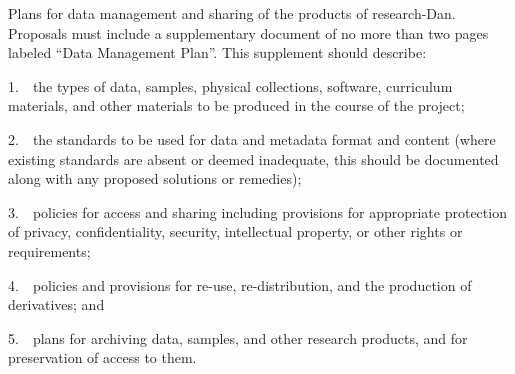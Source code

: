 











%
Plans for data management and sharing of the products of research-Dan.\\ 

Proposals must include a supplementary document of no more than
two pages labeled ``Data Management Plan''. This supplement should
describe:

\begin{list}{}{}
\item 1.~~the types of data, samples, physical collections, software, curriculum materials, and other materials to be produced in the course of the project;

\item 2.~~the standards to be used for data and metadata format and content (where existing standards are absent or deemed inadequate, this should be documented along with any proposed solutions or remedies);

\item 3.~~policies for access and sharing including provisions for appropriate protection of privacy, confidentiality, security, intellectual property, or other rights or requirements;

\item 4.~~policies and provisions for re-use, re-distribution, and the production of derivatives; and

\item 5.~~plans for archiving data, samples, and other research products, and for preservation of access to them.

\end{list}

%


